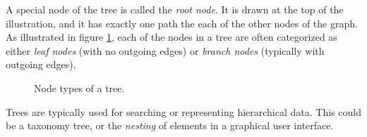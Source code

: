 A special node of the tree is called the \textsl{root node}. It is drawn at the top of the illustration, and it has exactly one path the each of the other nodes of the graph. As illustrated in figure \ref{fig:bs:graphs:trees:nodetypes}, each of the nodes in a tree are often categorized as either \textsl{leaf nodes} (with no outgoing edges) or \textsl{branch nodes} (typically with outgoing edges).

\begin{figure}[tbp]
  
  \caption{Node types of a tree.}
  \label{fig:bs:graphs:trees:nodetypes}
\end{figure}

Trees are typically used for searching or representing hierarchical data. This could be a taxonomy tree, or the \textsl{nesting} of elements in a graphical user interface.

